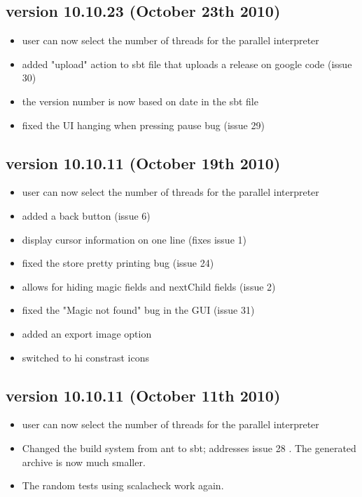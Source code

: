 \subsection{version 10.10.23 (October 23th 2010)}

\begin{itemize}
    \item user can now select the number of threads for the parallel interpreter
    \item added "upload" action to sbt file that uploads a release on google code (issue 30)
    \item the version number is now based on date in the sbt file
    \item fixed the UI hanging when pressing pause bug (issue 29)
\end{itemize}

\subsection{version 10.10.11 (October 19th 2010)}

\begin{itemize}
    \item user can now select the number of threads for the parallel interpreter
    \item added a back button (issue 6)
    \item display cursor information on one line (fixes  issue 1)
    \item fixed the store pretty printing bug (issue 24)
    \item allows for hiding magic fields and nextChild fields (issue 2)
    \item fixed the "Magic not found" bug in the GUI (issue 31)
    \item added an export image option
    \item switched to hi constrast icons 
\end{itemize}

\subsection{version 10.10.11 (October 11th 2010)}

\begin{itemize}
    \item user can now select the number of threads for the parallel interpreter
    \item Changed the build system from ant to sbt; addresses  issue 28 . The generated archive is now much smaller.
    \item The random tests using scalacheck work again. 
\end{itemize}

